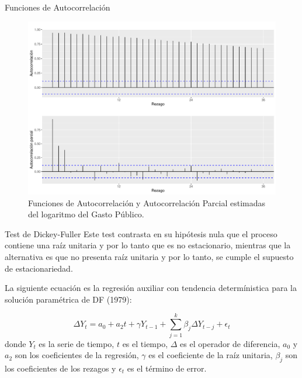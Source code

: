 \documentclass[
  ignorenonframetext,
]{beamer}
\begin{document}
\begin{frame}{Funciones de Autocorrelación}
\protect\hypertarget{funciones-de-autocorrelaciuxf3n}{}
\begin{figure}[H]

{\centering \includegraphics[width=0.85\linewidth]{presentacion_files/figure-beamer/unnamed-chunk-1-1} 

}

\caption{\label{fac_facp} Funciones de Autocorrelación y Autocorrelación Parcial estimadas del logaritmo del Gasto Público.}\label{fig:unnamed-chunk-1}
\end{figure}
\end{frame}

\begin{frame}{Test de Dickey-Fuller}
\protect\hypertarget{test-de-dickey-fuller}{}
Este test contrasta en su hipótesis nula que el proceso contiene una
raíz unitaria y por lo tanto que es no estacionario, mientras que la
alternativa es que no presenta raíz unitaria y por lo tanto, se cumple
el supuesto de estacionariedad.

La siguiente ecuación es la regresión auxiliar con tendencia
determínistica para la solución paramétrica de DF (1979):

\[ \Delta Y_t = a_0 + a_2 t + \gamma Y_{t-1} + \sum_{j=1}^{k} \beta_j \Delta Y_{t-j} + \epsilon_t \]
donde \(Y_t\) es la serie de tiempo, \(t\) es el tiempo, \(\Delta\) es
el operador de diferencia, \(a_0\) y \(a_2\) son los coeficientes de la
regresión, \(\gamma\) es el coeficiente de la raíz unitaria, \(\beta_j\)
son los coeficientes de los rezagos y \(\epsilon_t\) es el término de
error.
\end{frame}
\end{document}
